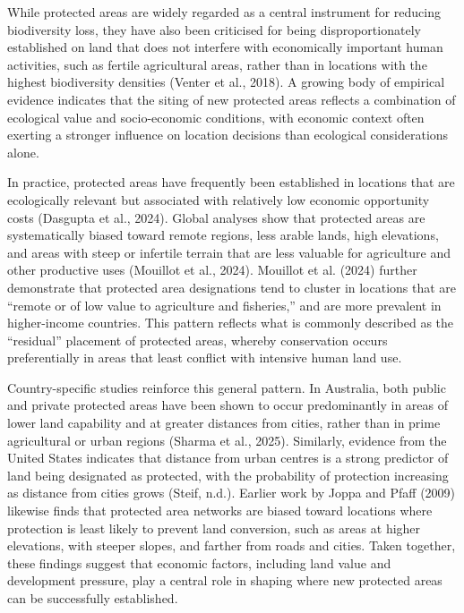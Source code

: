 \documentclass[12pt]{article}
\theoremstyle{break} %
\begin{document}
While protected areas are widely regarded as a central instrument for reducing biodiversity loss, they have also been criticised for being disproportionately established on land that does not interfere with economically important human activities, such as fertile agricultural areas, rather than in locations with the highest biodiversity densities (Venter et al., 2018). A growing body of empirical evidence indicates that the siting of new protected areas reflects a combination of ecological value and socio-economic conditions, with economic context often exerting a stronger influence on location decisions than ecological considerations alone.

In practice, protected areas have frequently been established in locations that are ecologically relevant but associated with relatively low economic opportunity costs (Dasgupta et al., 2024). Global analyses show that protected areas are systematically biased toward remote regions, less arable lands, high elevations, and areas with steep or infertile terrain that are less valuable for agriculture and other productive uses (Mouillot et al., 2024). Mouillot et al. (2024) further demonstrate that protected area designations tend to cluster in locations that are “remote or of low value to agriculture and fisheries,” and are more prevalent in higher-income countries. This pattern reflects what is commonly described as the “residual” placement of protected areas, whereby conservation occurs preferentially in areas that least conflict with intensive human land use.

Country-specific studies reinforce this general pattern. In Australia, both public and private protected areas have been shown to occur predominantly in areas of lower land capability and at greater distances from cities, rather than in prime agricultural or urban regions (Sharma et al., 2025). Similarly, evidence from the United States indicates that distance from urban centres is a strong predictor of land being designated as protected, with the probability of protection increasing as distance from cities grows (Steif, n.d.). Earlier work by Joppa and Pfaff (2009) likewise finds that protected area networks are biased toward locations where protection is least likely to prevent land conversion, such as areas at higher elevations, with steeper slopes, and farther from roads and cities. Taken together, these findings suggest that economic factors, including land value and development pressure, play a central role in shaping where new protected areas can be successfully established.
\end{document}
